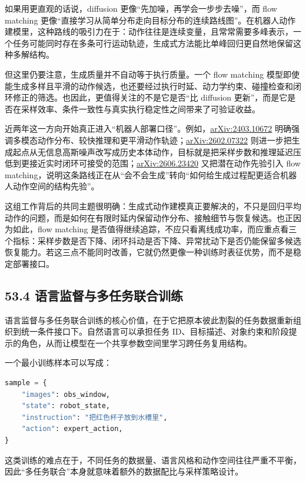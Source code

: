 如果用更直观的话说，diffusion 更像“先加噪，再学会一步步去噪”，而 flow matching 更像“直接学习从简单分布走向目标分布的连续路线图”。在机器人动作建模里，这种路线的吸引力在于：动作往往是连续变量，且常常需要多峰表示，一个任务可能同时存在多条可行运动轨迹，生成式方法能比单峰回归更自然地保留这种多解结构。

但这里仍要注意，生成质量并不自动等于执行质量。一个 flow matching 模型即使能生成多样且平滑的动作候选，也还要经过执行时延、动力学约束、碰撞检查和闭环修正的筛选。也因此，更值得关注的不是它是否“比 diffusion 更新”，而是它是否在采样效率、条件一致性与真实执行稳定性之间带来了可验证收益。

近两年这一方向开始真正进入“机器人部署口径”。例如，\href{https://arxiv.org/abs/2403.10672}{arXiv:2403.10672} 明确强调多模态动作分布、较快推理和更平滑动作轨迹；\href{https://arxiv.org/abs/2602.07322}{arXiv:2602.07322} 则进一步把生成起点从无信息高斯噪声改写成历史本体动作，目标就是把采样步数和推理延迟压低到更接近实时闭环可接受的范围；\href{https://arxiv.org/abs/2606.23420}{arXiv:2606.23420} 又把潜在动作先验引入 flow matching，说明这条路线正在从“会不会生成”转向“如何给生成过程配更适合机器人动作空间的结构先验”。

这组工作背后的共同主题很明确：生成式动作建模真正要解决的，不只是回归平均动作的问题，而是如何在有限时延内保留动作分布、接触细节与恢复候选。也正因为如此，flow matching 是否值得继续追踪，不应只看离线成功率，而应重点看三个指标：采样步数是否下降、闭环抖动是否下降、异常扰动下是否仍能保留多候选恢复能力。若这三点不能同时改善，它就仍然更像一种训练时表征优势，而不是稳定部署接口。

\subsection*{53.4 语言监督与多任务联合训练}


语言监督与多任务联合训练的核心价值，在于它把原本彼此割裂的任务数据重新组织到统一条件接口下。自然语言可以承担任务 ID、目标描述、对象约束和阶段提示的角色，从而让模型在一个共享参数空间里学习跨任务复用结构。

一个最小训练样本可以写成：

\begin{lstlisting}[language=python]
sample = {
    "images": obs_window,
    "state": robot_state,
    "instruction": "把红色杯子放到水槽里",
    "action": expert_action,
}
\end{lstlisting}

这类训练的难点在于，不同任务的数据量、语言风格和动作空间往往严重不平衡，因此“多任务联合”本身就意味着额外的数据配比与采样策略设计。


